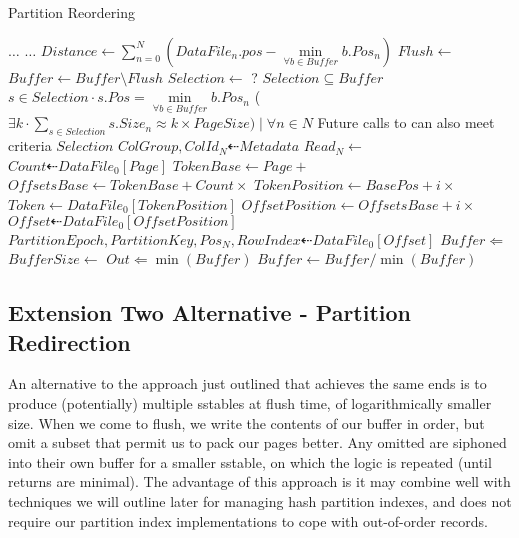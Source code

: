 \documentclass[fleqn]{article}
\begin{document}
\begin{algorithm}
\scriptsize
\caption{Partition Reordering}
\begin{algorithmic}[1]
\State $\dots$
\Statex
{} 
 \State $\dots$
 \State $Distance \gets \sum\limits_{n=0}^{N} (DataFile_{n}.pos - \min\limits_{\forall b \in Buffer} b.Pos_{n}) $
   \State $Flush \gets$ 
   \State {}
   \State $Buffer \gets Buffer \setminus Flush$
 \EndIf
\EndFor
\EndProcedure
\Statex
{}
\State $Selection \gets$ ?
\Ensure $Selection \subseteq Buffer$
\Ensure $s \in Selection \cdot s.Pos = \min\limits_{\forall b \in Buffer} b.Pos_{n}$
\Ensure ($\exists k \cdot \sum\limits_{s \in Selection} s.Size_{n} \approx k \times PageSize) \mid \forall n \in N $
\Ensure Future calls to  can also meet criteria
\State \Return $Selection$
\EndFunction
\Statex
{}
\State $ColGroup, ColId_N \dashleftarrow Metadata$
\State $Read_N \gets $ 
 \State $Count \dashleftarrow DataFile_{0}[Page]$
 \State $TokenBase \gets Page +  $ 
 \State $OffsetsBase \gets TokenBase + Count \times $
  \State $TokenPosition \gets BasePos + i \times $ 
  \State $Token \gets DataFile_0[TokenPosition]$
   \State $OffsetPosition \gets OffsetsBase + i \times $ 
   \State $Offset \dashleftarrow DataFile_{0}[OffsetPosition]$
   \State $PartitionEpoch, PartitionKey, Pos_N, RowIndex \dashleftarrow DataFile_{0}[Offset]$
   \State $Buffer \Leftarrow $ 
   \State $BufferSize \gets $ 
    \State $Out \Leftarrow \min(Buffer)$
    \State $Buffer \gets Buffer / {\min(Buffer)}$
   \EndIf
  \EndIf
 \EndFor
\EndFor
\EndProcedure
\end{algorithmic}
\end{algorithm}

\clearpage
\subsection{Extension Two Alternative - Partition Redirection}
\small
  An alternative to the approach just outlined that achieves the same ends is to 
  produce (potentially) multiple sstables at flush time, of logarithmically smaller size. 
  When we come to flush, we write the contents of our buffer in order, but omit a subset that
  permit us to pack our pages better. Any omitted are siphoned into their own buffer for a smaller
  sstable, on which the logic is repeated (until returns are minimal). The advantage of this approach
  is it may combine well with techniques we will outline later for managing hash partition indexes,
  and does not require our partition index implementations to cope with out-of-order records.
\end{document}
